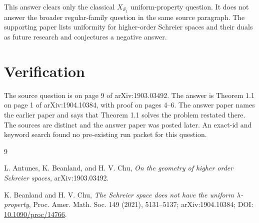 \documentclass[11pt]{article}
\begin{document}
This answer clears only the classical $X_{\mathcal S_1}$ uniform-property
question.  It does not answer the broader regular-family question in the same
source paragraph.  The supporting paper lists uniformity for higher-order
Schreier spaces and their duals as future research and conjectures a negative
answer.

\section*{Verification}

The source question is on page 9 of arXiv:1903.03492.  The answer is Theorem
1.1 on page 1 of arXiv:1904.10384, with proof on pages 4--6.  The answer paper
names the earlier paper and says that Theorem 1.1 solves the problem restated
there.  The sources are distinct and the answer paper was posted later.
An exact-id and keyword search found no pre-existing run packet for this
question.

\begin{thebibliography}{9}

L. Antunes, K. Beanland, and H. V. Chu,
\emph{On the geometry of higher order Schreier spaces},
arXiv:1903.03492.

K. Beanland and H. V. Chu,
\emph{The Schreier space does not have the uniform $\lambda$-property},
Proc. Amer. Math. Soc. 149 (2021), 5131--5137;
arXiv:1904.10384; DOI: \href{https://doi.org/10.1090/proc/14766}{10.1090/proc/14766}.

\end{thebibliography}
\end{document}
